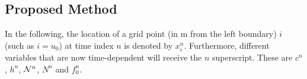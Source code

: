 \subsection{Proposed Method}\label{sec:proposedMethod}
In the following, the location of a grid point (in m from the left boundary) $i$ (such as $i = u_0$) at time index $n$ is denoted by $x_i^n$.  
Furthermore, different variables that are now time-dependent will receive the $n$ superscript. These are $c^n$, $h^n$, $\mathcal{N}^n$, $N^n$ and $f_0^n$.

